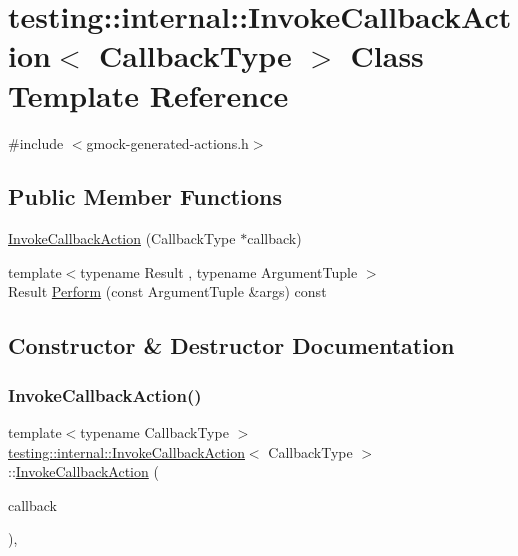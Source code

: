 \hypertarget{classtesting_1_1internal_1_1InvokeCallbackAction}{}\section{testing\+::internal\+::Invoke\+Callback\+Action$<$ Callback\+Type $>$ Class Template Reference}
\label{classtesting_1_1internal_1_1InvokeCallbackAction}


{\ttfamily \#include $<$gmock-\/generated-\/actions.\+h$>$}

\subsection*{Public Member Functions}
\begin{DoxyCompactItemize}
\item 
\mbox{\hyperlink{classtesting_1_1internal_1_1InvokeCallbackAction_a21b051db0b2e1d33fd8d5cdfe7e6824b}{Invoke\+Callback\+Action}} (Callback\+Type $\ast$callback)
\item 
{\footnotesize template$<$typename Result , typename Argument\+Tuple $>$ }\\Result \mbox{\hyperlink{classtesting_1_1internal_1_1InvokeCallbackAction_a74278acbfc51fe7407fdabc9d6a42c70}{Perform}} (const Argument\+Tuple \&args) const
\end{DoxyCompactItemize}


\subsection{Constructor \& Destructor Documentation}
\mbox{\label{classtesting_1_1internal_1_1InvokeCallbackAction_a21b051db0b2e1d33fd8d5cdfe7e6824b}} 
\subsubsection{\texorpdfstring{InvokeCallbackAction()}{InvokeCallbackAction()}}
{\footnotesize\ttfamily template$<$typename Callback\+Type $>$ \\
\mbox{\hyperlink{classtesting_1_1internal_1_1InvokeCallbackAction}{testing\+::internal\+::\+Invoke\+Callback\+Action}}$<$ Callback\+Type $>$\+::\mbox{\hyperlink{classtesting_1_1internal_1_1InvokeCallbackAction}{Invoke\+Callback\+Action}} (\begin{DoxyParamCaption}\item[{Callback\+Type $\ast$}]{callback }\end{DoxyParamCaption})\hspace{0.3cm}{\ttfamily [inline]}, {\ttfamily [explicit]}}



